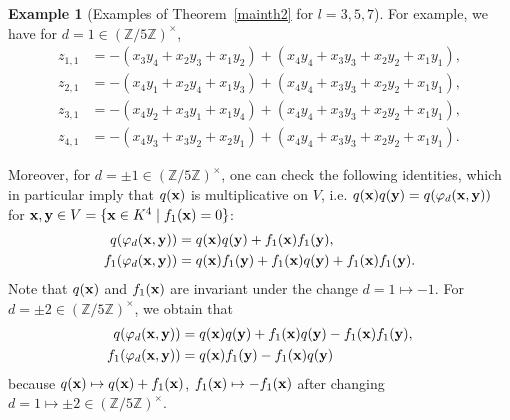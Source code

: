 \documentclass[a4paper, 11pt]{amsart}
\newcommand{\Z}{\mathbb Z}
\theoremstyle{plain}
\theoremstyle{definition}
\newtheorem{example}[thm]{Example}
\numberwithin{equation}{section}
\begin{document}
\begin{example}[Examples of Theorem~\ref{mainth2} for $l=3,5,7$]
For example, we have for $d=1 \in (\Z/5\Z)^\times$,
\begin{align*}
z_{1,1}
&=-(x_3y_4 + x_2y_3 + x_1y_2 )
+(x_4y_4 + x_3y_3 + x_2y_2 + x_1y_1 ),\\
z_{2,1}
&=-(x_{4}y_1 + x_2y_4 + x_1y_3 )
+(x_{4}y_4 + x_3y_3 + x_2y_2 + x_1y_1 ),\\
z_{3,1}
&=-(x_4y_2 + x_3y_1 + x_1y_4 )
+(x_4y_4 + x_3y_3 + x_2y_2 + x_1y_1 ),\\
z_{4,1}
&=-(x_{4}y_3 + x_3y_2 + x_2y_1)
+(x_{4}y_4 + x_3y_3 + x_2y_2 + x_1y_1 ).
\end{align*}

Moreover, for $d=\pm 1\in (\Z/5\Z)^\times$, 
one can check the following identities, which in particular imply that $q({\bf x})$ is multiplicative on $V$, i.e. 
$q({\bf x})q({\bf y})=q(\varphi_d({\bf x}, {\bf y}))$ for 
${\bf x},{\bf y} \in V=\{{\bf x}\in K^4\mid f_1({\bf x})=0\}$:
\begin{align*}
q(\varphi_d({\bf x},{\bf y}))&=
q({\bf x})q({\bf y})+f_1({\bf x})f_1({\bf y}),\\
f_1(\varphi_d({\bf x},{\bf y}))&=
q({\bf x})f_1({\bf y})+f_1({\bf x})q({\bf y})+f_1({\bf x})f_1({\bf y}).
\end{align*}
Note that $q({\bf x})$ and $f_1({\bf x})$ are invariant 
under the change $d=1\mapsto -1$. 
For $d=\pm 2\in (\Z/5\Z)^\times$, we obtain that 
\begin{align*}
q(\varphi_d({\bf x},{\bf y}))&=
q({\bf x})q({\bf y})+f_1({\bf x})q({\bf y})-f_1({\bf x})f_1({\bf y}),\\
f_1(\varphi_d({\bf x},{\bf y}))&=
q({\bf x})f_1({\bf y})-f_1({\bf x})q({\bf y})
\end{align*}
because $q({\bf x})\mapsto q({\bf x})+f_1({\bf x})$, 
$f_1({\bf x})\mapsto -f_1({\bf x})$ after changing $d=1\mapsto \pm 2\in (\Z/5\Z)^\times$.\\


\end{example}
\end{document}

